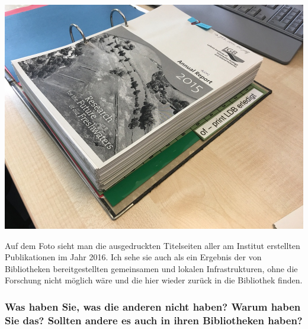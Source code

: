 \begin{center}
\includegraphics{igb/img/publikationen.jpg}
\end{center}

Auf dem Foto sieht man die ausgedruckten Titelseiten aller am Institut
erstellten Publikationen im Jahr 2016. Ich sehe sie auch als ein
Ergebnis der von Bibliotheken bereitgestellten gemeinsamen und lokalen
Infrastrukturen, ohne die Forschung nicht möglich wäre und die hier
wieder zurück in die Bibliothek finden.

\hypertarget{was-haben-sie-was-die-anderen-nicht-haben-warum-haben-sie-das-sollten-andere-es-auch-in-ihren-bibliotheken-haben}{%
\subsubsection*{Was haben Sie, was die anderen nicht haben? Warum haben Sie
das? Sollten andere es auch in ihren Bibliotheken
haben?}\label{was-haben-sie-was-die-anderen-nicht-haben-warum-haben-sie-das-sollten-andere-es-auch-in-ihren-bibliotheken-haben}}

